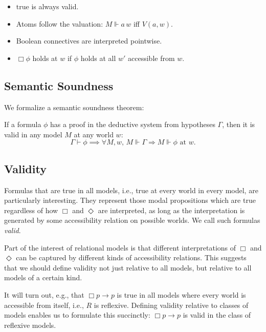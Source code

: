 \begin{definition}
  \label{def:example}
  \leanok
\begin{itemize}
  \item $\text{true}$ is always valid.
  \item Atoms follow the valuation: $M \Vdash a\, w$ iff $V(a, w)$.
  \item Boolean connectives are interpreted pointwise.
  \item $\Box \phi$ holds at $w$ if $\phi$ holds at all $w'$ accessible from $w$.
\end{itemize}
\end{definition}

\subsection{Semantic Soundness}

We formalize a semantic soundness theorem:

\begin{theorem}
    \label{thm:semantic-soundness}
If a formula $\phi$ has a proof in the deductive system from hypotheses $\Gamma$, then it is valid in any model $M$ at any world $w$:
\[
\Gamma \vdash \phi \implies \forall M, w,\, M \Vdash \Gamma \Rightarrow M \Vdash \phi \text{ at } w.
\]
\end{theorem}

\subsection{Validity}

Formulas that are true in all models, i.e., true at every world in 
every model, are particularly interesting. They represent those modal 
propositions which are true regardless of how $\Box$ and $\Diamond$ are 
interpreted, as long as the interpretation is generated by some accessibility 
relation on possible worlds. We call such formulas \emph{valid}.

Part of the interest of relational models is that different interpretations 
of $\Box$ and $\Diamond$ can be captured by different kinds of accessibility 
relations. This suggests that we should define validity not just relative to 
all models, but relative to all models of a certain kind.

It will turn out, e.g., that $\Box p \to p$ is true in all models where every 
world is accessible from itself, i.e., $R$ is reflexive. Defining validity 
relative to classes of models enables us to formulate this succinctly: 
$\Box p \to p$ is valid in the class of reflexive models.

